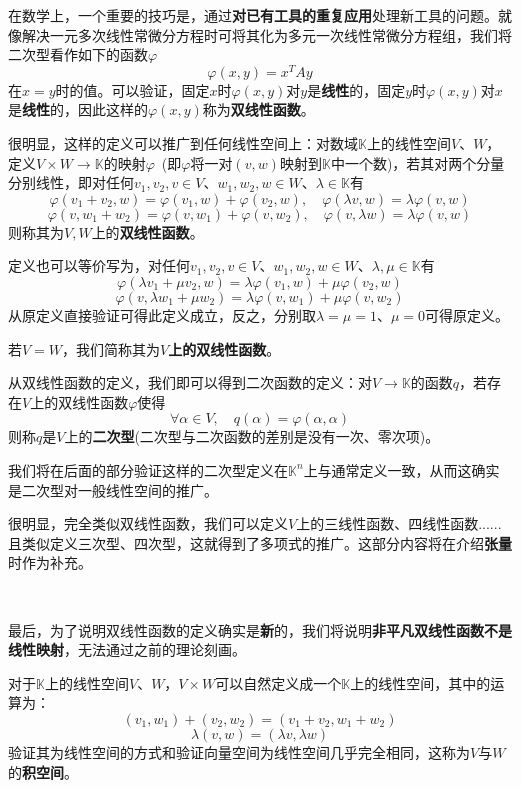 \documentclass[a4paper,UTF8,fontset=windows,AutoFakeBold]{ctexart}
\newcommand*{\note}{\noindent *}
\begin{document}
在数学上，一个重要的技巧是，通过\textbf{对已有工具的重复应用}处理新工具的问题。就像解决一元多次线性常微分方程时可将其化为多元一次线性常微分方程组，我们将二次型看作如下的函数$\varphi$
$$\varphi(x,y)=x^TAy$$
在$x=y$时的值。可以验证，固定$x$时$\varphi(x,y)$对$y$是\textbf{线性}的，固定$y$时$\varphi(x,y)$对$x$是\textbf{线性}的，因此这样的$\varphi(x,y)$称为\textbf{双线性函数}。

很明显，这样的定义可以推广到任何线性空间上：对数域$\mathbb{K}$上的线性空间$V$、$W$，定义$V\times W\to\mathbb{K}$的映射$\varphi$\ (即$\varphi$将一对$(v,w)$映射到$\mathbb{K}$中一个数)，若其对两个分量分别线性，即对任何$v_1,v_2,v\in V$、$w_1,w_2,w\in W$、$\lambda\in\mathbb{K}$有
$$\varphi(v_1+v_2,w)=\varphi(v_1,w)+\varphi(v_2,w),\quad\varphi(\lambda v,w)=\lambda\varphi(v,w)$$
$$\varphi(v,w_1+w_2)=\varphi(v,w_1)+\varphi(v,w_2),\quad\varphi(v,\lambda w)=\lambda\varphi(v,w)$$
则称其为$V,W$上的\textbf{双线性函数}。

\note 定义也可以等价写为，对任何$v_1,v_2,v\in V$、$w_1,w_2,w\in W$、$\lambda,\mu\in\mathbb{K}$有
$$\varphi(\lambda v_1+\mu v_2,w)=\lambda\varphi(v_1,w)+\mu\varphi(v_2,w)$$
$$\varphi(v,\lambda w_1+\mu w_2)=\lambda\varphi(v,w_1)+\mu\varphi(v,w_2)$$
从原定义直接验证可得此定义成立，反之，分别取$\lambda=\mu=1$、$\mu=0$可得原定义。

\note 若$V=W$，我们简称其为\textbf{$V$上的双线性函数}。

从双线性函数的定义，我们即可以得到二次函数的定义：对$V\to\mathbb{K}$的函数$q$，若存在$V$上的双线性函数$\varphi$使得
$$\forall\alpha\in V,\quad q(\alpha)=\varphi(\alpha,\alpha)$$
则称$q$是$V$上的\textbf{二次型}(二次型与二次函数的差别是没有一次、零次项)。

\note 我们将在后面的部分验证这样的二次型定义在$\mathbb{K}^n$上与通常定义一致，从而这确实是二次型对一般线性空间的推广。

\note 很明显，完全类似双线性函数，我们可以定义$V$上的三线性函数、四线性函数......且类似定义三次型、四次型，这就得到了多项式的推广。这部分内容将在介绍\textbf{张量}时作为补充。

\

最后，为了说明双线性函数的定义确实是\textbf{新}的，我们将说明\textbf{非平凡双线性函数不是线性映射}，无法通过之前的理论刻画。

对于$\mathbb{K}$上的线性空间$V$、$W$，$V\times W$可以自然定义成一个$\mathbb{K}$上的线性空间，其中的运算为：
$$(v_1,w_1)+(v_2,w_2)=(v_1+v_2,w_1+w_2)$$
$$\lambda(v,w)=(\lambda v,\lambda w)$$
验证其为线性空间的方式和验证向量空间为线性空间几乎完全相同，这称为$V$与$W$的\textbf{积空间}。
\end{document}
